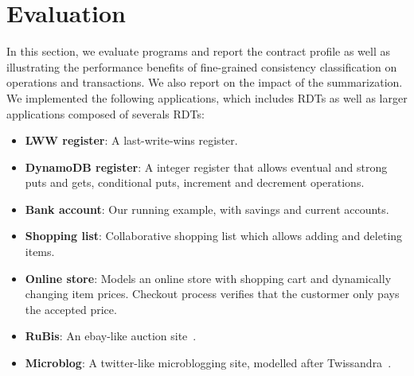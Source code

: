 \section{Evaluation}

In this section, we evaluate \name programs and report the contract profile as
well as illustrating the performance benefits of fine-grained consistency
classification on operations and transactions. We also report on the impact of
the summarization. We implemented the following applications, which includes
RDTs as well as larger applications composed of severals RDTs:

\begin{itemize}
\item \textbf{LWW register}: A last-write-wins register.
\item \textbf{DynamoDB register}: A integer register that allows eventual and
strong puts and gets, conditional puts, increment and decrement operations.
\item \textbf{Bank account}: Our running example, with savings and current
accounts.
\item \textbf{Shopping list}: Collaborative shopping list which allows adding
and deleting items.
\item \textbf{Online store}: Models an online store with shopping cart and
dynamically changing item prices. Checkout process verifies that the custormer
only pays the accepted price.
\item \textbf{RuBis}: An ebay-like auction site~\cite{}.
\item \textbf{Microblog}: A twitter-like microblogging site, modelled after
Twissandra~\cite{}.
\end{itemize}
